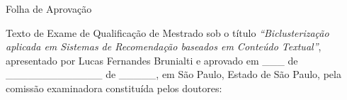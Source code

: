 \documentclass[normaltoc, espacoumemeio, pnumromarab,ruledheader]{abnt}
\begin{document}
\begin{folhadeaprovacao}
\pretextualchapter{}
\begin{center}
Folha de Aprovação
\end{center}

\noindent Texto de Exame de Qualificação de Mestrado sob o título \textit{\textquotedblleft Biclusterização aplicada em Sistemas de Recomendação baseados em Conteúdo Textual\textquotedblright}, apresentado por Lucas Fernandes Brunialti e aprovado em \_\_\_ de \_\_\_\_\_\_\_\_\_\_\_\_\_ de \_\_\_\_\_, em São Paulo, Estado de São Paulo, pela comissão examinadora constituída pelos doutores: %

%


\end{folhadeaprovacao}



	
\end{document}
